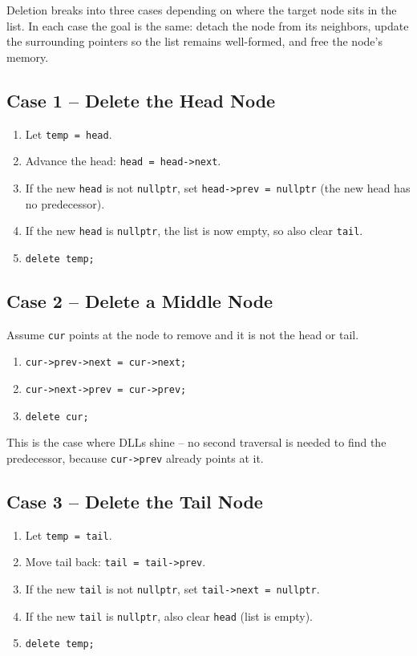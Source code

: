 \documentclass[11pt]{article}
\begin{document}
Deletion breaks into three cases depending on where the target node sits in
the list. In each case the goal is the same: detach the node from its
neighbors, update the surrounding pointers so the list remains well-formed,
and free the node's memory.

\subsection{Case 1 -- Delete the Head Node}
\begin{enumerate}[leftmargin=*]
    \item Let \texttt{temp = head}.
    \item Advance the head: \texttt{head = head->next}.
    \item If the new \texttt{head} is not \texttt{nullptr}, set
          \texttt{head->prev = nullptr} (the new head has no predecessor).
    \item If the new \texttt{head} is \texttt{nullptr}, the list is now empty,
          so also clear \texttt{tail}.
    \item \texttt{delete temp;}
\end{enumerate}

\subsection{Case 2 -- Delete a Middle Node}
Assume \texttt{cur} points at the node to remove and it is not the head or
tail.
\begin{enumerate}[leftmargin=*]
    \item \texttt{cur->prev->next = cur->next;}
    \item \texttt{cur->next->prev = cur->prev;}
    \item \texttt{delete cur;}
\end{enumerate}
This is the case where DLLs shine -- no second traversal is needed to find
the predecessor, because \texttt{cur->prev} already points at it.

\subsection{Case 3 -- Delete the Tail Node}
\begin{enumerate}[leftmargin=*]
    \item Let \texttt{temp = tail}.
    \item Move tail back: \texttt{tail = tail->prev}.
    \item If the new \texttt{tail} is not \texttt{nullptr}, set
          \texttt{tail->next = nullptr}.
    \item If the new \texttt{tail} is \texttt{nullptr}, also clear
          \texttt{head} (list is empty).
    \item \texttt{delete temp;}
\end{enumerate}
\end{document}
